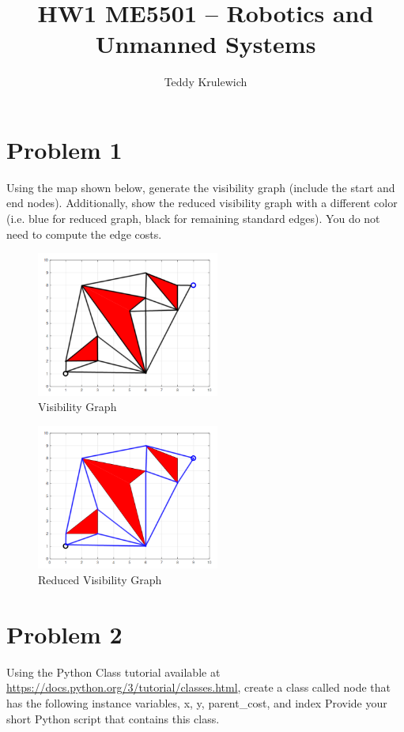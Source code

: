 \documentclass{article}
\author{Teddy Krulewich}
\title{\vspace{-4em}HW1 ME5501 – Robotics and Unmanned Systems}
\begin{document}
\maketitle

\section*{Problem 1}

Using the map shown below, generate the visibility graph (include the start and end nodes). 
Additionally, show the reduced visibility graph with a different color (i.e. blue for reduced graph, 
black for remaining standard edges). You do not need to compute the edge costs. 

\begin{figure}[h]
    \centering
    \includegraphics[width=6cm]{question1-visibility.png}
    \caption*{Visibility Graph}
\end{figure}

\begin{figure}[h]
    \centering
    \includegraphics[width=6cm]{question1-reduced-visibility.png}
    \caption*{Reduced Visibility Graph}
\end{figure}

\newpage

\section*{Problem 2}

Using the Python Class tutorial available at \url{https://docs.python.org/3/tutorial/classes.html},
create a class called node that has the following instance variables, x, y, parent\_cost, and index
Provide your short Python script that contains this class. 
\end{document}
